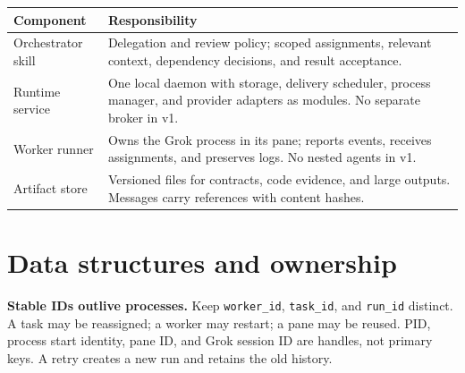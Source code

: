 \documentclass[11pt,letterpaper]{article}
\begin{document}
\begin{tabularx}{\linewidth}{@{}>{\raggedright\arraybackslash}p{31mm}Y@{}}
\toprule\textbf{Component} & \textbf{Responsibility}\\\midrule
Orchestrator skill & Delegation and review policy; scoped assignments, relevant context, dependency decisions, and result acceptance.\\
Runtime service & One local daemon with storage, delivery scheduler, process manager, and provider adapters as modules. No separate broker in v1.\\
Worker runner & Owns the Grok process in its pane; reports events, receives assignments, and preserves logs. No nested agents in v1.\\
Artifact store & Versioned files for contracts, code evidence, and large outputs. Messages carry references with content hashes.\\
\bottomrule
\end{tabularx}

\clearpage
\section*{Data structures and ownership}
\textbf{Stable IDs outlive processes.} Keep \texttt{worker\_id}, \texttt{task\_id},
and \texttt{run\_id} distinct. A task may be reassigned; a worker may restart; a pane
may be reused. PID, process start identity, pane ID, and Grok session ID are handles,
not primary keys. A retry creates a new run and retains the old history.
\end{document}
